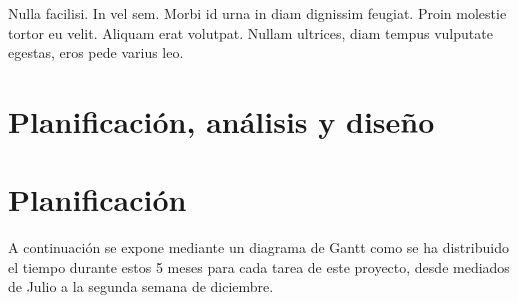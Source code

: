 \begin{savequote}[75mm]
Nulla facilisi. In vel sem. Morbi id urna in diam dignissim feugiat. Proin molestie tortor eu velit. Aliquam erat volutpat. Nullam ultrices, diam tempus vulputate egestas, eros pede varius leo.
\end{savequote}

\chapter{Planificación, análisis y diseño}
\chapter*{Planificación}
A continuación se expone mediante un \textcolor{SchoolColor}{diagrama de Gantt} como se ha distribuido el tiempo durante estos 5 meses para cada tarea de este proyecto, desde mediados de Julio a la segunda semana de diciembre.
\\[\baselineskip]
